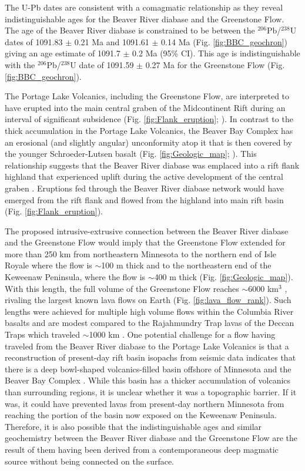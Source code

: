 \documentclass[draft]{agujournal2019}
\begin{document}
The U-Pb dates are consistent with a comagmatic relationship as they reveal indistinguishable ages for the Beaver River diabase and the Greenstone Flow. The age of the Beaver River diabase is constrained to be between the $^{206}$Pb/$^{238}$U dates of  1091.83 $\pm$ 0.21 Ma and 1091.61 $\pm$ 0.14 Ma (Fig. \ref{fig:BBC_geochron}) giving an age estimate of 1091.7 $\pm$ 0.2 Ma (95\% CI). This age is indistinguishable with the $^{206}$Pb/$^{238}$U date of 1091.59 $\pm$ 0.27 Ma for the Greenstone Flow (Fig. \ref{fig:BBC_geochron}).

The Portage Lake Volcanics, including the Greenstone Flow, are interpreted to have erupted into the main central graben of the Midcontinent Rift during an interval of significant subsidence (Fig. \ref{fig:Flank_eruption}; ). In contrast to the thick accumulation in the Portage Lake Volcanics, the Beaver Bay Complex has an erosional (and slightly angular) unconformity atop it that is then covered by the younger Schroeder-Lutsen basalt (Fig. \ref{fig:Geologic_map}; ). This relationship suggests that the Beaver River diabase was emplaced into a rift flank highland that experienced uplift during the active development of the central graben \cite{Swanson-Hysell2019a}. Eruptions fed through the Beaver River diabase network would have emerged from the rift flank and flowed from the highland into main rift basin (Fig. \ref{fig:Flank_eruption}). 

The proposed intrusive-extrusive connection between the Beaver River diabase and the Greenstone Flow would imply that the Greenstone Flow extended for more than 250 km from northeastern Minnesota to the northern end of Isle Royale where the flow is $\sim$100 m thick and to the northeastern end of the Keweenaw Peninsula, where the flow is $\sim$400 m thick (Fig. \ref{fig:Geologic_map}). With this length, the full volume of the Greenstone Flow reaches $\sim$6000 km$^3$ \cite{Doyle2016a}, rivaling the largest known lava flows on Earth (Fig. \ref{fig:lava_flow_rank}). Such lengths were achieved for multiple high volume flows within the Columbia River basalts \cite{Reidel2013a} and are modest compared to the Rajahmundry Trap lavas of the Deccan Traps which traveled $\sim$1000 km \cite{Self2008a}. One potential challenge for a flow having traveled from the Beaver River diabase to the Portage Lake Volcanics is that a reconstruction of present-day rift basin isopachs from seismic data indicates that there is a deep bowl-shaped volcanics-filled basin offshore of Minnesota and the Beaver Bay Complex \cite{Stewart2018a}. While this basin has a thicker accumulation of volcanics than surrounding regions, it is unclear whether it was a topographic barrier. If it was, it could have prevented lavas from present-day northern Minnesota from reaching the portion of the basin now exposed on the Keweenaw Peninsula. Therefore, it is also possible that the indistinguishable ages and similar geochemistry between the Beaver River diabase and the Greenstone Flow are the result of them having been derived from a contemporaneous deep magmatic source without being connected on the surface. 
\end{document}
